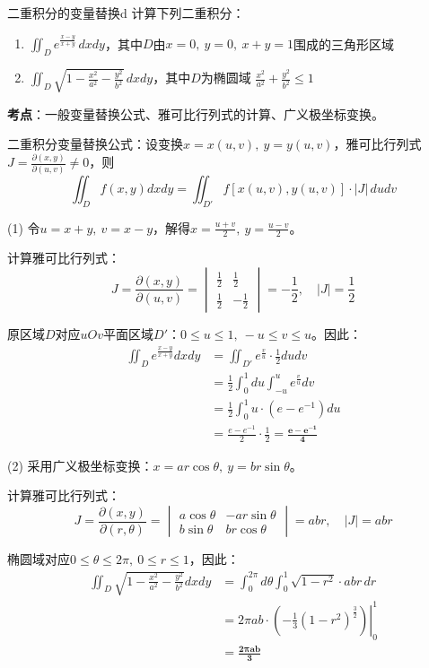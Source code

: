 \documentclass[UTF8,zihao=-4,openany]{ctexbook}
\begin{document}
\begin{example}{二重积分的变量替换}{d}
计算下列二重积分：
\begin{enumerate}
  \item $\displaystyle \iint_D e^{\frac{x-y}{x+y}} \, dxdy$，其中$D$由$x=0,\ y=0,\ x+y=1$围成的三角形区域
  \item $\displaystyle \iint_D \sqrt{1-\frac{x^2}{a^2}-\frac{y^2}{b^2}} \, dxdy$，其中$D$为椭圆域 $\frac{x^2}{a^2}+\frac{y^2}{b^2} \leq 1$
\end{enumerate}
\tcblower
\smallskip
\noindent \textbf{考点}：一般变量替换公式、雅可比行列式的计算、广义极坐标变换。

二重积分变量替换公式：设变换$x=x(u,v),\ y=y(u,v)$，雅可比行列式$J = \frac{\partial(x,y)}{\partial(u,v)} \neq 0$，则
$$
\iint_D f(x,y) dxdy = \iint_{D'} f[x(u,v),y(u,v)] \cdot |J| \, dudv
$$

\medskip
(1) 令$u = x+y,\ v = x-y$，解得$x = \frac{u+v}{2},\ y = \frac{u-v}{2}$。

计算雅可比行列式：
$$
J = \frac{\partial(x,y)}{\partial(u,v)} = \begin{vmatrix} \frac{1}{2} & \frac{1}{2} \\ \frac{1}{2} & -\frac{1}{2} \end{vmatrix} = -\frac{1}{2}, \quad |J| = \frac{1}{2}
$$

原区域$D$对应$uOv$平面区域$D'$：$0\leq u\leq 1,\ -u\leq v\leq u$。因此：
$$
\begin{aligned}
\iint_D e^{\frac{x-y}{x+y}} dxdy &= \iint_{D'} e^{\frac{v}{u}} \cdot \frac{1}{2} dudv \\
&= \frac{1}{2} \int_{0}^{1} du \int_{-u}^{u} e^{\frac{v}{u}} dv \\
&= \frac{1}{2} \int_{0}^{1} u \cdot \left( e - e^{-1} \right) du \\
&= \frac{e - e^{-1}}{2} \cdot \frac{1}{2} = \boldsymbol{\frac{e - e^{-1}}{4}}
\end{aligned}
$$

\medskip
(2) 采用广义极坐标变换：$x = ar\cos\theta,\ y = br\sin\theta$。

计算雅可比行列式：
$$
J = \frac{\partial(x,y)}{\partial(r,\theta)} = \begin{vmatrix} a\cos\theta & -ar\sin\theta \\ b\sin\theta & br\cos\theta \end{vmatrix} = abr, \quad |J| = abr
$$

椭圆域对应$0\leq \theta\leq 2\pi,\ 0\leq r\leq 1$，因此：
$$
\begin{aligned}
\iint_D \sqrt{1-\frac{x^2}{a^2}-\frac{y^2}{b^2}} dxdy &= \int_{0}^{2\pi} d\theta \int_{0}^{1} \sqrt{1-r^2} \cdot abr \, dr \\
&= 2\pi ab \cdot \left. \left( -\frac{1}{3}(1-r^2)^{\frac{3}{2}} \right) \right|_{0}^{1} \\
&= \boldsymbol{\frac{2\pi ab}{3}}
\end{aligned}
$$
\end{example}
\end{document}
